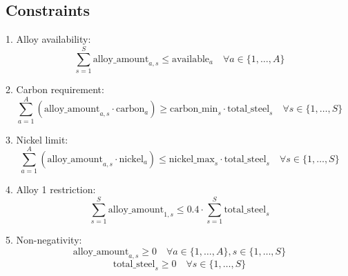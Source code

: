 \documentclass{article}
\begin{document}
\subsection*{Constraints}
1. Alloy availability:
\[
\sum_{s=1}^{S} \text{alloy\_amount}_{a,s} \leq \text{available}_a \quad \forall a \in \{1, \ldots, A\}
\]

2. Carbon requirement:
\[
\sum_{a=1}^{A} \left( \text{alloy\_amount}_{a,s} \cdot \text{carbon}_a \right) \geq \text{carbon\_min}_s \cdot \text{total\_steel}_s \quad \forall s \in \{1, \ldots, S\}
\]

3. Nickel limit:
\[
\sum_{a=1}^{A} \left( \text{alloy\_amount}_{a,s} \cdot \text{nickel}_a \right) \leq \text{nickel\_max}_s \cdot \text{total\_steel}_s \quad \forall s \in \{1, \ldots, S\}
\]

4. Alloy 1 restriction:
\[
\sum_{s=1}^{S} \text{alloy\_amount}_{1,s} \leq 0.4 \cdot \sum_{s=1}^{S} \text{total\_steel}_s
\]

5. Non-negativity:
\[
\text{alloy\_amount}_{a,s} \geq 0 \quad \forall a \in \{1, \ldots, A\}, s \in \{1, \ldots, S\}
\]
\[
\text{total\_steel}_s \geq 0 \quad \forall s \in \{1, \ldots, S\}
\]
\end{document}
